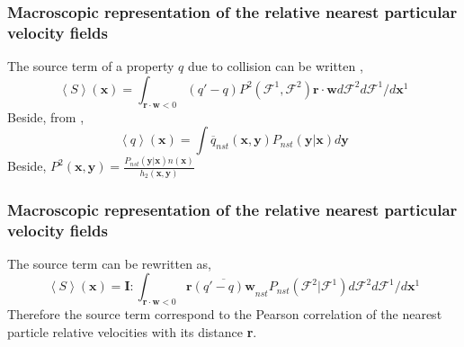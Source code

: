 \documentclass{sintefbeamer}
\newcommand{\avg}[1]{\left<#1\right>}
\newcommand{\nstavg}[1]{\overline{#1}_{nst}}
\begin{document}
\begin{frame}
  \frametitle{Macroscopic representation of the relative nearest particular velocity fields}

  The source term of a property $q$ due to collision can be written \citep{rao2008introduction},
\begin{equation*}
  \avg{S}(\textbf{x}) = \int_{\textbf{r} \cdot \textbf{w} < 0} \left(q' - q\right)
  P^2(\mathcal{F}^1, \mathcal{F}^2)\textbf{r} \cdot \textbf{w} d\mathcal{F}^2 d\mathcal{F}^1 / d\textbf{x}^1
\end{equation*}
Beside, from \citet{zhang2021ensemble},
\begin{equation*}
  \avg{q}(\textbf{x}) = \int \nstavg{q}(\textbf{x},\textbf{y})P_{nst}(\textbf{y}|\textbf{x})d\textbf{y}
\end{equation*}
Beside, $P^2(\textbf{x}, \textbf{y}) = \frac{P_{nst}(\textbf{y}|\textbf{x})  n(\textbf{x})}{h_2(\textbf{x},\textbf{y})} $
\end{frame}
\begin{frame}
  \frametitle{Macroscopic representation of the relative nearest particular velocity fields}

  The source term can be rewritten as, 
  \begin{equation*}
    \avg{S}(\textbf{x}) =\textbf{I} : \int_{\textbf{r} \cdot \textbf{w} < 0} 
    \textbf{r} \nstavg{\left(q' - q\right) \textbf{w}}
    P_{nst}(\mathcal{F}^2| \mathcal{F}^1) d\mathcal{F}^2 d\mathcal{F}^1 / d\textbf{x}^1
  \end{equation*}
  Therefore the source term correspond to the Pearson correlation of the nearest particle relative velocities with its distance \textbf{r}. 
\end{frame}
\end{document}
